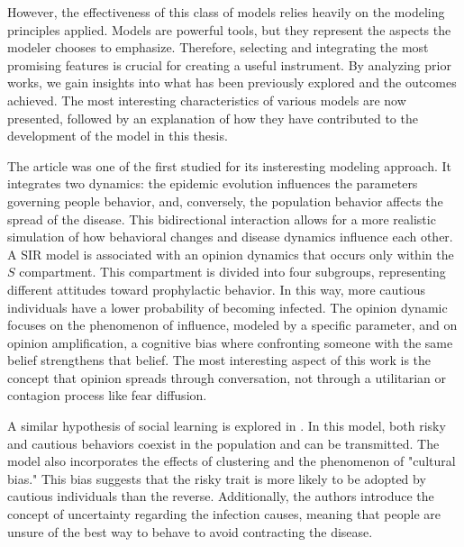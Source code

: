 However, the effectiveness of this class of models relies heavily on the modeling principles applied. Models are powerful tools, but they represent the aspects the modeler chooses to emphasize. Therefore, selecting and integrating the most promising features is crucial for creating a useful instrument. By analyzing prior works, we gain insights into what has been previously explored and the outcomes achieved.
The most interesting characteristics of various models are now presented, followed by an explanation of how they have contributed to the development of the model in this thesis.

The article \cite{Tyson_2020} was one of the first studied for its insteresting modeling approach. It integrates two dynamics: the epidemic evolution influences the parameters governing people behavior, and, conversely, the population behavior affects the spread of the disease. This bidirectional interaction allows for a more realistic simulation of how behavioral changes and disease dynamics influence each other.
A SIR model is associated with an opinion dynamics that occurs only within the $S$ compartment. This compartment is divided into four subgroups, representing different attitudes toward prophylactic behavior. In this way, more cautious individuals have a lower probability of becoming infected. The opinion dynamic focuses on the phenomenon of influence, modeled by a specific parameter, and on opinion amplification, a cognitive bias where confronting someone with the same belief strengthens that belief.
The most interesting aspect of this work is the concept that opinion spreads through conversation, not through a utilitarian or contagion process like fear diffusion.

A similar hypothesis of social learning is explored in \cite{Tanaka_2002}. In this model, both risky and cautious behaviors coexist in the population and can be transmitted. The model also incorporates the effects of clustering and the phenomenon of "cultural bias." This bias suggests that the risky trait is more likely to be adopted by cautious individuals than the reverse. Additionally, the authors introduce the concept of uncertainty regarding the infection causes, meaning that people are unsure of the best way to behave to avoid contracting the disease.


